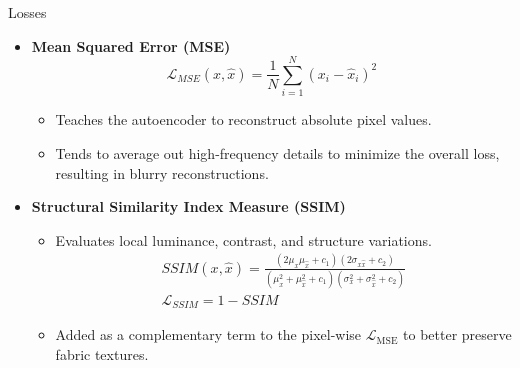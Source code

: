 \documentclass{beamer}
\begin{document}
\begin{frame}{Losses}
    \begin{itemize}\small
        \item \textbf{Mean Squared Error (MSE)} 
        \begin{equation*}
            \mathcal{L}_{MSE}(x, \hat{x}) = \frac{1}{N}\sum_{i=1}^{N} (x_i - \hat{x}_i)^2
        \end{equation*} \begin{itemize}
            \item Teaches the autoencoder to reconstruct absolute pixel values.
            \item Tends to average out high-frequency details to minimize the overall loss, resulting in blurry reconstructions.
        \end{itemize}
        \item \textbf{Structural Similarity Index Measure (SSIM)} \begin{itemize}
            \item Evaluates local luminance, contrast, and structure variations.
            \begin{gather*}
                SSIM(x, \hat{x}) = \frac{(2\mu_x \mu_{\hat{x}} + c_1)(2 \sigma_{x \hat{x}} + c_2)}{(\mu_x^2 + \mu_{\hat{x}}^2 + c_1)(\sigma_x^2 + \sigma_{\hat{x}}^2 + c_2)}\\
                \mathcal{L}_{SSIM} = 1 - SSIM
            \end{gather*}
            \item Added as a complementary term to the pixel-wise $\mathcal{L}_{\text{MSE}}$ to better preserve fabric textures.
        \end{itemize}
    \end{itemize}
\end{frame}
\end{document}
